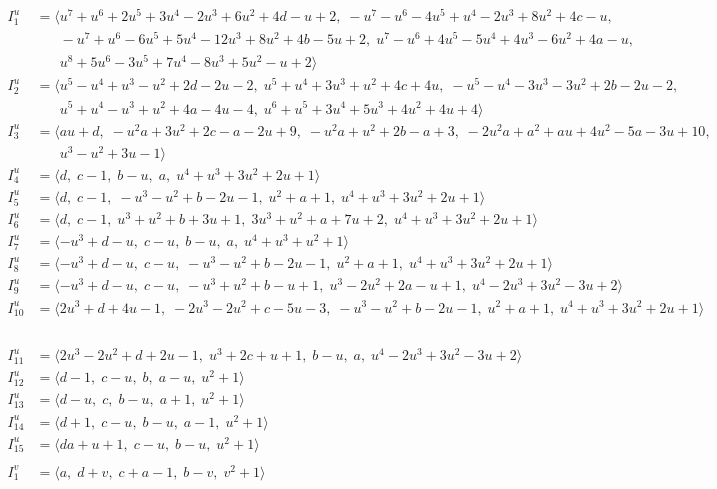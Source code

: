 \documentclass[1p]{elsarticle_modified}
\theoremstyle{definition}
\begin{document}
\begin{align*}
I^u_{1}&=\langle 
u^7+u^6+2 u^5+3 u^4-2 u^3+6 u^2+4 d- u+2,\;- u^7- u^6-4 u^5+u^4-2 u^3+8 u^2+4 c- u,\\
\phantom{I^u_{1}}&\phantom{= \langle  }- u^7+u^6-6 u^5+5 u^4-12 u^3+8 u^2+4 b-5 u+2,\;u^7- u^6+4 u^5-5 u^4+4 u^3-6 u^2+4 a- u,\\
\phantom{I^u_{1}}&\phantom{= \langle  }u^8+5 u^6-3 u^5+7 u^4-8 u^3+5 u^2- u+2\rangle \\
I^u_{2}&=\langle 
u^5- u^4+u^3- u^2+2 d-2 u-2,\;u^5+u^4+3 u^3+u^2+4 c+4 u,\;- u^5- u^4-3 u^3-3 u^2+2 b-2 u-2,\\
\phantom{I^u_{2}}&\phantom{= \langle  }u^5+u^4- u^3+u^2+4 a-4 u-4,\;u^6+u^5+3 u^4+5 u^3+4 u^2+4 u+4\rangle \\
I^u_{3}&=\langle 
a u+d,\;- u^2 a+3 u^2+2 c- a-2 u+9,\;- u^2 a+u^2+2 b- a+3,\;-2 u^2 a+a^2+a u+4 u^2-5 a-3 u+10,\\
\phantom{I^u_{3}}&\phantom{= \langle  }u^3- u^2+3 u-1\rangle \\
I^u_{4}&=\langle 
d,\;c-1,\;b- u,\;a,\;u^4+u^3+3 u^2+2 u+1\rangle \\
I^u_{5}&=\langle 
d,\;c-1,\;- u^3- u^2+b-2 u-1,\;u^2+a+1,\;u^4+u^3+3 u^2+2 u+1\rangle \\
I^u_{6}&=\langle 
d,\;c-1,\;u^3+u^2+b+3 u+1,\;3 u^3+u^2+a+7 u+2,\;u^4+u^3+3 u^2+2 u+1\rangle \\
I^u_{7}&=\langle 
- u^3+d- u,\;c- u,\;b- u,\;a,\;u^4+u^3+u^2+1\rangle \\
I^u_{8}&=\langle 
- u^3+d- u,\;c- u,\;- u^3- u^2+b-2 u-1,\;u^2+a+1,\;u^4+u^3+3 u^2+2 u+1\rangle \\
I^u_{9}&=\langle 
- u^3+d- u,\;c- u,\;- u^3+u^2+b- u+1,\;u^3-2 u^2+2 a- u+1,\;u^4-2 u^3+3 u^2-3 u+2\rangle \\
I^u_{10}&=\langle 
2 u^3+d+4 u-1,\;-2 u^3-2 u^2+c-5 u-3,\;- u^3- u^2+b-2 u-1,\;u^2+a+1,\;u^4+u^3+3 u^2+2 u+1\rangle \\
\end{align*}\\
\begin{align*}
I^u_{11}&=\langle 
2 u^3-2 u^2+d+2 u-1,\;u^3+2 c+u+1,\;b- u,\;a,\;u^4-2 u^3+3 u^2-3 u+2\rangle \\
I^u_{12}&=\langle 
d-1,\;c- u,\;b,\;a- u,\;u^2+1\rangle \\
I^u_{13}&=\langle 
d- u,\;c,\;b- u,\;a+1,\;u^2+1\rangle \\
I^u_{14}&=\langle 
d+1,\;c- u,\;b- u,\;a-1,\;u^2+1\rangle \\
I^u_{15}&=\langle 
d a+u+1,\;c- u,\;b- u,\;u^2+1\rangle \\
\\
I^v_{1}&=\langle 
a,\;d+v,\;c+a-1,\;b- v,\;v^2+1\rangle \\
\end{align*}
\end{document}
